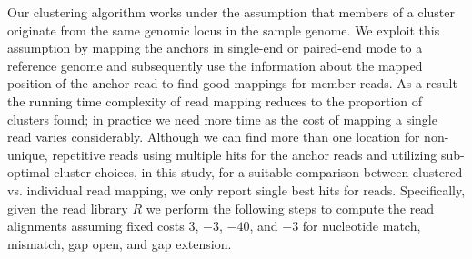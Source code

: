 \documentclass[a4paper]{article}
\begin{document}
Our clustering algorithm works under the assumption that
members of a cluster originate from the same genomic locus in the
sample genome. We exploit this assumption by mapping the anchors in
single-end or paired-end mode to a reference genome and subsequently
use the
information about the mapped position of the anchor read to find good
mappings for member reads. As a result the running time complexity of read
mapping reduces to the proportion of clusters found; in practice
we need more time
as the cost of mapping a single read varies
considerably.
Although we can find more than one location for non-unique, repetitive reads
using multiple hits for the anchor reads and utilizing sub-optimal cluster choices,
in this study, for a suitable comparison between clustered vs. individual
read mapping, we only report single best hits for reads.
Specifically, given the read library $R$ we perform the
following steps to compute the read alignments assuming fixed costs
$3$, $-3$, $-40$, and $-3$
for nucleotide match, mismatch, gap open, and gap extension.
\end{document}
